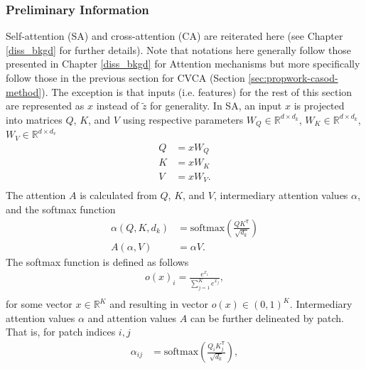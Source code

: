 \subsubsection{Preliminary Information}
Self-attention (SA) and cross-attention (CA) are reiterated here (see Chapter \ref{diss_bkgd} for further details). Note that notations here generally follow those presented in Chapter \ref{diss_bkgd} for Attention mechanisms but more specifically follow those in the previous section for CVCA (Section \ref{sec:propwork-casod-method}). The exception is that inputs (i.e. features) for the rest of this section are represented as $x$ instead of $\tilde{z}$ for generality. In SA,
an input $x$ is projected into matrices $Q$, $K$, and $V$ using respective parameters $W_Q \in \mathbb{R}^{d \times d_k}$, $W_K \in \mathbb{R}^{d \times d_k}$, $W_V \in \mathbb{R}^{d \times d_v}$
\begin{equation}
\begin{aligned}
    Q & = x W_Q \\
    K & = x W_K \\
    V & = x W_V. \\
\end{aligned}
\end{equation}
The attention $A$ is calculated from $Q$, $K$, and $V$, intermediary attention values $\alpha$, and the softmax function
\begin{equation}
\begin{aligned}
    \alpha(Q,K,d_k) & = \text{softmax} (\frac{Q K^{\mathsf{T}}}{\sqrt{d_k}}) \\
    A(\alpha,V) & = \alpha V.
\end{aligned}
\end{equation}
The softmax function is defined as follows
\begin{equation}
\begin{aligned}
    o(x)_i = \frac{e^{x_i}}{\sum_{j=1}^{K} e^{x_j}}, \\
\end{aligned}
\end{equation}
for some vector $x \in \mathbb{R}^K$ and resulting in vector $o(x) \in (0,1)^K$. Intermediary attention values $\alpha$ and attention values $A$ can be further delineated by patch. That is, for patch indices $i,j$
\begin{equation}
\begin{aligned}
    \alpha_{ij} & = \text{softmax} (\frac{Q_i K_j^{\mathsf{T}}}{\sqrt{d_k}}), \\
\end{aligned}
\end{equation}
